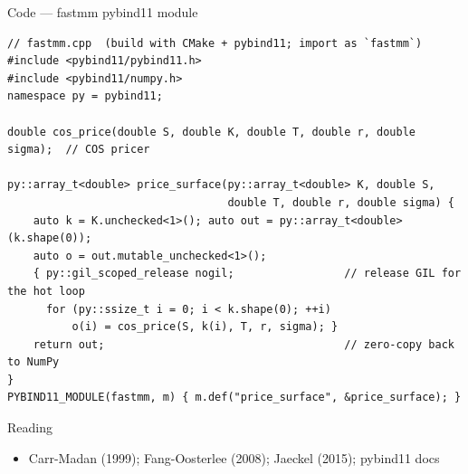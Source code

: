 \documentclass[aspectratio=169,10pt]{beamer}
\begin{document}
\begin{frame}[fragile]{Code --- fastmm pybind11 module}
\begin{lstlisting}
// fastmm.cpp  (build with CMake + pybind11; import as `fastmm`)
#include <pybind11/pybind11.h>
#include <pybind11/numpy.h>
namespace py = pybind11;

double cos_price(double S, double K, double T, double r, double sigma);  // COS pricer

py::array_t<double> price_surface(py::array_t<double> K, double S,
                                  double T, double r, double sigma) {
    auto k = K.unchecked<1>(); auto out = py::array_t<double>(k.shape(0));
    auto o = out.mutable_unchecked<1>();
    { py::gil_scoped_release nogil;                 // release GIL for the hot loop
      for (py::ssize_t i = 0; i < k.shape(0); ++i)
          o(i) = cos_price(S, k(i), T, r, sigma); }
    return out;                                     // zero-copy back to NumPy
}
PYBIND11_MODULE(fastmm, m) { m.def("price_surface", &price_surface); }
\end{lstlisting}
\end{frame}
\begin{frame}{Reading}
\begin{itemize}
  \item Carr-Madan (1999); Fang-Oosterlee (2008); Jaeckel (2015); pybind11 docs
\end{itemize}
\end{frame}
\end{document}
